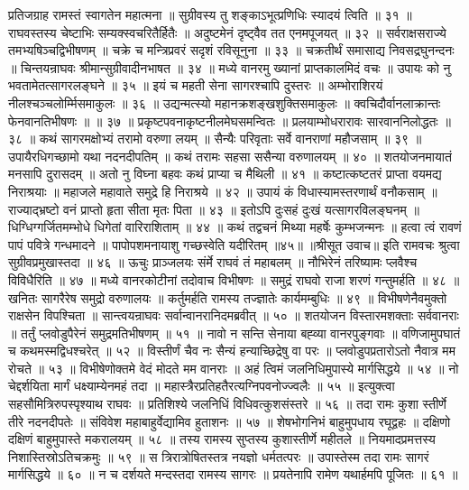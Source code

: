 प्रतिजग्राह रामस्तं स्वागतेन महात्मना ॥
सुग्रीवस्य तु शङ्काऽभूत्प्रणिधिः स्यादयं त्विति ॥ ३१ ॥
राघवस्तस्य चेष्टाभिः सम्यक्स्वचरितैर्हितैः ॥
अदुष्टमेनं दृष्ट्वैव तत एनमपूजयत् ॥ ३२ ॥
सर्वराक्षसराज्ये तमभ्यषिञ्चद्विभीषणम् ॥
चक्रे च मन्त्रिप्रवरं सदृशं रविसूनुना ॥ ३३ ॥
चक्रतीर्थं समासाद्य निवसद्रघुनन्दनः ॥
चिन्तयन्राघवः श्रीमान्सुग्रीवादीनभाषत ॥ ३४ ॥
मध्ये वानरमु ख्यानां प्राप्तकालमिदं वचः ॥
उपायः को नु भवतामेतत्सागरलङ्घने ॥ ३५ ॥
इयं च महती सेना सागरश्चापि दुस्तरः ॥
अम्भोराशिरयं नीलश्चञ्चलोर्म्मिसमाकुलः ॥ ३६ ॥
उद्यन्मत्स्यो महानक्रशङ्खशुक्तिसमाकुलः ॥
क्वचिदौर्वानलाक्रान्तः फेनवानतिभीषणः ॥ ॥ ३७ ॥
प्रकृष्टपवनाकृष्टनीलमेघसमन्वितः ॥
प्रलयाम्भोधरारावः सारवाननिलोद्धतः ॥ ३८ ॥
कथं सागरमक्षोभ्यं तरामो वरुणा लयम् ॥
सैन्यैः परिवृताः सर्वे वानराणां महौजसाम् ॥ ३९ ॥
उपायैरधिगच्छामो यथा नदनदीपतिम् ॥
कथं तरामः सहसा ससैन्या वरुणालयम् ॥ ४० ॥
शतयोजनमायातं मनसापि दुरासदम् ॥
अतो नु विघ्ना बहवः कथं प्राप्या च मैथिली ॥ ४१ ॥
कष्टात्कष्टतरं प्राप्ता वयमद्य निराश्रयाः ॥
महाजले महावाते समुद्रे हि निराश्रये ॥ ४२ ॥
उपायं कं विधास्यामस्तरणार्थं वनौकसाम् ॥
राज्याद्भ्रष्टो वनं प्राप्तो हृता सीता मृतः पिता ॥ ४३ ॥
इतोऽपि दुःसहं दुःखं यत्सागरविलङ्घनम् ॥
धिग्धिग्गर्जितमम्भोधे धिगेतां वारिराशिताम् ॥ ४४ ॥
कथं तद्वचनं मिथ्या महर्षेः कुम्भजन्मनः ॥
हत्वा त्वं रावणं पापं पवित्रे गन्धमादने ॥
पापोपशमनायाशु गच्छस्वेति यदीरितम् ॥४५॥
॥श्रीसूत उवाच॥
इति रामवचः श्रुत्वा सुग्रीवप्रमुखास्तदा ॥ ४६ ॥
ऊचुः प्राञ्जलयः संर्मे राघवं तं महाबलम् ॥
नौभिरेनं तरिष्यामः प्लवैश्च विविधैरिति ॥ ४७ ॥
मध्ये वानरकोटीनां तदोवाच विभीषणः ॥
समुद्रं राघवो राजा शरणं गन्तुमर्हति ॥ ४८ ॥
खनितः सागरैरेष समुद्रो वरुणालयः ॥
कर्तुमर्हति रामस्य तज्ज्ञातेः कार्यमम्बुधिः ॥ ४९ ॥
विभीषणेनैवमुक्तो राक्षसेन विपश्चिता ॥
सान्त्वयन्राघवः सर्वान्वानरानिदमब्रवीत् ॥ ५० ॥
शतयोजन विस्तारमशक्ताः सर्ववानराः ॥
तर्तुं प्लवोडुपैरेनं समुद्रमतिभीषणम् ॥ ५१ ॥
नावो न सन्ति सेनाया बह्व्या वानरपुङ्गवाः ॥
वणिजामुपघातं च कथमस्मद्विधश्चरेत् ॥ ५२ ॥
विस्तीर्णं चैव नः सैन्यं हन्याच्छिद्रेषु वा परः ॥
प्लवोडुपप्रतारोऽतो नैवात्र मम रोचते ॥ ५३ ॥
विभीषेणोक्तमे वेदं मोदते मम वानराः ॥
अहं त्विमं जलनिधिमुपास्ये मार्गसिद्धये ॥ ५४ ॥
नो चेद्दर्शयिता मार्गं धक्ष्याम्येनमहं तदा ॥
महास्त्रैरप्रतिहतैरत्यग्निपवनोज्ज्वलैः ॥ ५५ ॥
इत्युक्त्वा सहसौमित्रिरुपस्पृश्याथ राघवः ॥
प्रतिशिश्ये जलनिधिं विधिवत्कुशसंस्तरे ॥ ५६ ॥
तदा रामः कुशा स्तीर्णे तीरे नदनदीपतेः ॥
संविवेश महाबाहुर्वेद्यामिव हुताशनः ॥ ५७ ॥
शेषभोगनिभं बाहुमुपधाय रघूद्वहः ॥
दक्षिणो दक्षिणं बाहुमुपास्ते मकरालयम् ॥ ५८ ॥
तस्य रामस्य सुप्तस्य कुशास्तीर्णे महीतले ॥
नियमादप्रमत्तस्य निशास्तिस्रोऽतिचक्रमुः ॥ ५९ ॥
स त्रिरात्रोषितस्तत्र नयज्ञो धर्मतत्परः ॥
उपास्तेस्म तदा रामः सागरं मार्गसिद्धये ॥ ६० ॥
न च दर्शयते मन्दस्तदा रामस्य सागरः ॥
प्रयतेनापि रामेण यथार्हमपि पूजितः ॥ ६१ ॥
